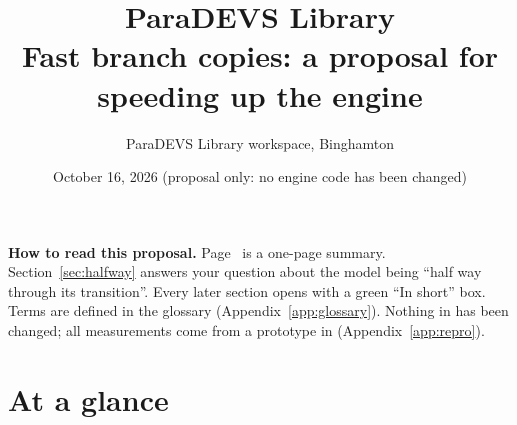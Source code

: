 \documentclass[11pt]{article}
\title{\textbf{ParaDEVS Library}\\[4pt]\large Fast branch copies: a proposal for speeding up the engine}
\author{ParaDEVS Library workspace, Binghamton}
\date{October 16, 2026 \quad (proposal only: no engine code has been changed)}
\begin{document}
\maketitle

\begin{center}
\begin{minipage}{0.88\linewidth}\small
\textbf{How to read this proposal.} Page~\pageref{sec:glance} is a one-page summary. Section~\ref{sec:halfway}
answers your question about the model being ``half way through its transition''. Every later section opens with a
green ``In short'' box. Terms are defined in the glossary (Appendix~\ref{app:glossary}). Nothing in
 has been changed; all measurements come from a prototype in 
(Appendix~\ref{app:repro}).
\end{minipage}
\end{center}

\relateddocs

\tableofcontents
\newpage

\section{At a glance}\label{sec:glance}
\end{document}
